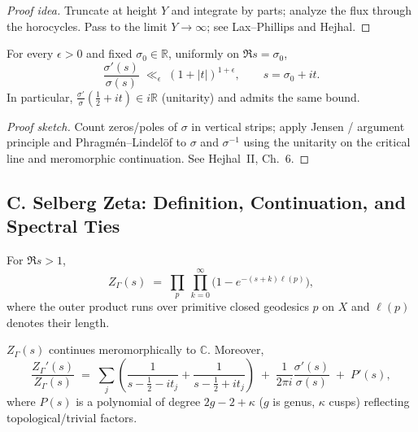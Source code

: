 \begin{proof}[Proof idea]
Truncate at height $Y$ and integrate by parts; analyze the flux through the horocycles. Pass to the limit $Y\to\infty$; see Lax–Phillips and Hejhal.
\end{proof}

\begin{proposition}
\label{prop:growth-sigma-expanded}
For every $\epsilon>0$ and fixed $\sigma_0\in\mathbb R$, uniformly on $\Re s=\sigma_0$,
\[
  \frac{\sigma'(s)}{\sigma(s)} \;\ll_\epsilon\; (1+|t|)^{1+\epsilon},\qquad s=\sigma_0+it.
\]
In particular, $\frac{\sigma'}{\sigma}(\tfrac12+it)\in i\mathbb R$ (unitarity) and admits the same bound.
\end{proposition}

\begin{proof}[Proof sketch]
Count zeros/poles of $\sigma$ in vertical strips; apply Jensen / argument principle and Phragmén–Lindelöf to $\sigma$ and $\sigma^{-1}$ using the unitarity on the critical line and meromorphic continuation. See Hejhal~II, Ch.~6.
\end{proof}


\subsection*{C. Selberg Zeta: Definition, Continuation, and Spectral Ties}
\label{subsec:selberg-zeta-expanded}

\begin{definition}
\label{def:selberg-zeta}
For $\Re s>1$,
\[
  Z_\Gamma(s) \;=\; \prod_{p}\ \prod_{k=0}^\infty \Big(1-e^{-(s+k)\ell(p)}\Big),
\]
where the outer product runs over primitive closed geodesics $p$ on $X$ and $\ell(p)$ denotes their length.
\end{definition}

\begin{theorem}
\label{thm:Z-cont-expanded}
$Z_\Gamma(s)$ continues meromorphically to $\mathbb C$. Moreover,
\begin{equation}
\label{eq:ZprimeZ-expanded}
   \frac{Z_\Gamma'(s)}{Z_\Gamma(s)} \;=\;
   \sum_{j}\!\left(\frac{1}{s-\tfrac12-it_j}+\frac{1}{s-\tfrac12+it_j}\right)
   \;+\; \frac{1}{2\pi i}\frac{\sigma'(s)}{\sigma(s)} \;+\; P'(s),
\end{equation}
where $P(s)$ is a polynomial of degree $2g-2+\kappa$ ($g$ is genus, $\kappa$ cusps) reflecting topological/trivial factors.
\end{theorem}

